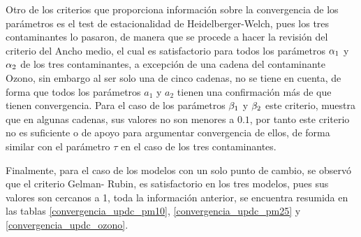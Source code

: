 Otro de los criterios que proporciona información sobre la convergencia de los parámetros es el test de estacionalidad de Heidelberger-Welch, pues los tres contaminantes lo pasaron, de manera que se procede a hacer la revisión del criterio del Ancho medio, el cual es satisfactorio para todos los parámetros $\alpha_1$ y $\alpha_2$ de los tres contaminantes, a excepción de una cadena del contaminante Ozono, sin embargo al ser solo una de cinco cadenas, no se tiene en cuenta, de forma que todos los parámetros $a_1$ y $a_2$ tienen una confirmación más de que tienen convergencia. Para el caso de los parámetros $\beta_1$ y $\beta_2$ este criterio, muestra que en algunas cadenas, sus valores no son menores a $0.1$, por tanto este criterio no es suficiente o de apoyo para argumentar convergencia de ellos, de forma similar con el parámetro $\tau$ en el caso de los tres contaminantes. 


Finalmente, para el caso de los modelos con un solo punto de cambio, se observó que el criterio Gelman- Rubin, es satisfactorio en los tres modelos, pues sus valores son cercanos a 1, toda la información anterior, se encuentra resumida en las tablas \ref{convergencia_updc_pm10}, \ref{convergencia_updc_pm25} y \ref{convergencia_updc_ozono}.




